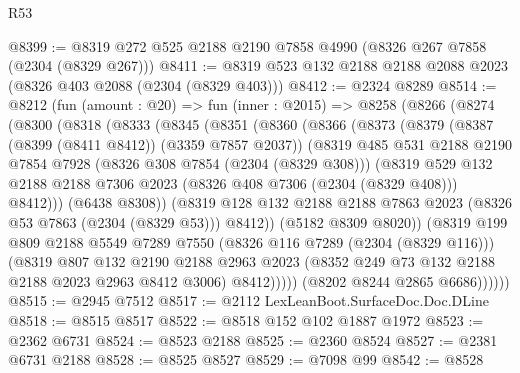 \begin{lexlean}{R53}
\begin{coremodule}
@8399 := @8319 @272 @525 @2188 @2190 @7858 @4990 (@8326 @267 @7858 (@2304 (@8329 @267)))
@8411 := @8319 @523 @132 @2188 @2188 @2088 @2023 (@8326 @403 @2088 (@2304 (@8329 @403)))
@8412 := @2324 @8289
@8514 := @8212
    (fun (amount : @20) =>
    fun (inner : @2015) =>
    @8258
      (@8266
        (@8274
          (@8300
            (@8318
              (@8333
                (@8345
                  (@8351
                    (@8360
                      (@8366
                        (@8373
                          (@8379
                            (@8387 (@8399 (@8411 @8412)) (@3359 @7857 @2037))
                            (@8319
                              @485
                              @531
                              @2188
                              @2190
                              @7854
                              @7928
                              (@8326 @308 @7854 (@2304 (@8329 @308)))
                              (@8319
                                @529
                                @132
                                @2188
                                @2188
                                @7306
                                @2023
                                (@8326 @408 @7306 (@2304 (@8329 @408)))
                                @8412)))
                          (@6438 @8308))
                        (@8319
                          @128
                          @132
                          @2188
                          @2188
                          @7863
                          @2023
                          (@8326 @53 @7863 (@2304 (@8329 @53)))
                          @8412))
                      (@5182 @8309 @8020))
                    (@8319
                      @199
                      @809
                      @2188
                      @5549
                      @7289
                      @7550
                      (@8326 @116 @7289 (@2304 (@8329 @116)))
                      (@8319
                        @807
                        @132
                        @2190
                        @2188
                        @2963
                        @2023
                        (@8352 @249 @73 @132 @2188 @2188 @2023 @2963 @8412 @3006)
                        @8412)))))
              (@8202 @8244 @2865 @6686))))))
@8515 := @2945 @7512
@8517 := @2112 LexLeanBoot.SurfaceDoc.Doc.DLine
@8518 := @8515 @8517
@8522 := @8518 @152 @102 @1887 @1972
@8523 := @2362 @6731
@8524 := @8523 @2188
@8525 := @2360 @8524
@8527 := @2381 @6731 @2188
@8528 := @8525 @8527
@8529 := @7098 @99
@8542 := @8528

\end{coremodule}
\end{lexlean}

